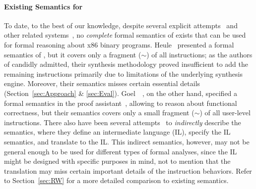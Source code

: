 \paragraph{Existing Semantics for \ISA}

To date, to the best of our knowledge, despite several explicit attempts~\cite{Heule2016a,Goel:FMCAD14,Goel:ProCoS17} and other related systems~\cite{Leroy:2009,Remill,TSL:TOPLAS13,Hasabnis:ASPLOS16,Hasabnis:FSE16},
no \emph{complete} formal semantics of \ISA exists that can be used for formal reasoning about x86 binary programs.
%
Heule~\etal \cite{Heule2016a} presented a formal semantics of \ISA, but it covers only a fragment ($\sim$\strataPerc{}) of all instructions; as the authors of \cite{Heule2016a} candidly admitted, their synthesis methodology proved insufficient to add the remaining instructions primarily due to limitations of the underlying synthesis engine. 
%
Moreover, their semantics misses certain essential details (Section~\ref{sec:Approach} \& \ref{sec:Eval}).
%
%
Goel~\etal~\cite{Goel:FMCAD14,Goel:ProCoS17}, on the other hand, specified a formal semantics in the  proof assistant~\cite{ACL2:Kaufmann2000}, allowing to reason about functional correctness, but their semantics covers only a small fragment ($\sim$\goelPerc{}) of all user-level instructions.
%
There also have been several attempts~\cite{Angr1,BAP:CAV11,Radare2,Hasabnis:FSE16} to \emph{indirectly} describe the \ISA semantics, where they define an intermediate language (IL), specify the IL semantics, and translate \ISA to the IL.
This indirect semantics, however, may not be general enough to be used for different types of formal analyses, since the IL might be designed with specific purposes in mind, not to mention that the translation may miss certain important details of the instruction behaviors.
%
Refer to Section~\ref{sec:RW} for a more detailed comparison to existing semantics.

